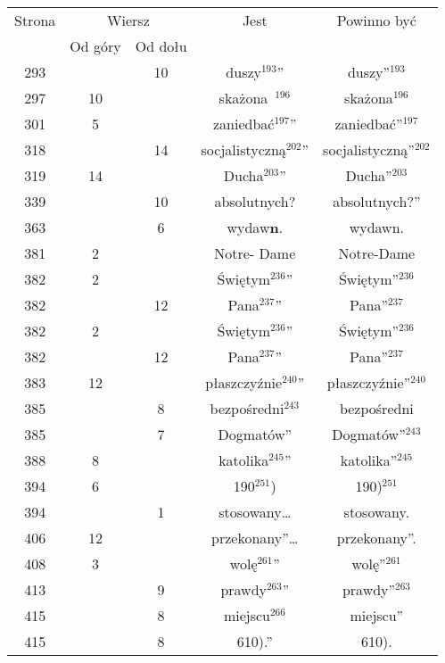 \documentclass[a4paper,11pt]{article}
\begin{document}
\begin{center}
  \begin{tabular}{|c|c|c|c|c|}
    \hline
    Strona & \multicolumn{2}{c|}{Wiersz} & Jest
                              & Powinno być \\ \cline{2-3}
    & Od góry & Od dołu & & \\
    \hline
    293 & & 10 & duszy$^{ 193 }$” & duszy”$^{ 193 }$ \\
    297 & 10 & & skażona~$^{ 196 }$ & skażona$^{ 196 }$ \\
    301 & \hphantom{0}5 & & zaniedbać$^{ 197 }$” & zaniedbać”$^{ 197 }$ \\
    318 & & 14 & socjalistyczną$^{ 202 }$” & socjalistyczną”$^{ 202 }$ \\
    319 & 14 & & Ducha$^{ 203 }$” & Ducha”$^{ 203 }$ \\
    339 & & 10 & absolutnych? & absolutnych?” \\
    363 & & \hphantom{0}6 & wydaw\textbf{n}. & wydawn. \\
    381 & \hphantom{0}2 & & Notre- Dame & Notre-Dame \\
    382 & \hphantom{0}2 & & Świętym$^{ 236 }$” & Świętym”$^{ 236 }$ \\
    382 & & 12 & Pana$^{ 237 }$” & Pana”$^{ 237 }$ \\
    382 & \hphantom{0}2 & & Świętym$^{ 236 }$” & Świętym”$^{ 236 }$ \\
    382 & & 12 & Pana$^{ 237 }$” & Pana”$^{ 237 }$ \\
    383 & 12 & & płaszczyźnie$^{ 240 }$” & płaszczyźnie”$^{ 240 }$ \\
    385 & & \hphantom{0}8 & bezpośredni$^{ 243 }$ & bezpośredni \\
    385 & & \hphantom{0}7 & Dogmatów” & Dogmatów”$^{ 243 }$ \\
    388 & \hphantom{0}8 & & katolika$^{ 245 }$” & katolika”$^{ 245 }$ \\
    394 & \hphantom{0}6 & & 190$^{ 251 }$) & 190)$^{ 251 }$ \\
    394 & & \hphantom{0}1 & stosowany\ldots & stosowany. \\
    406 & 12 & & przekonany”\ldots & przekonany”. \\
    408 & \hphantom{0}3 & & wolę$^{ 261 }$” & wolę”$^{ 261 }$ \\
    413 & & \hphantom{0}9 & prawdy$^{ 263 }$” & prawdy”$^{ 263 }$ \\
    415 & & \hphantom{0}8 & miejscu$^{ 266 }$ & miejscu” \\
    415 & & \hphantom{0}8 & 610).” & 610). \\

\end{tabular}
\end{center}
\end{document}
